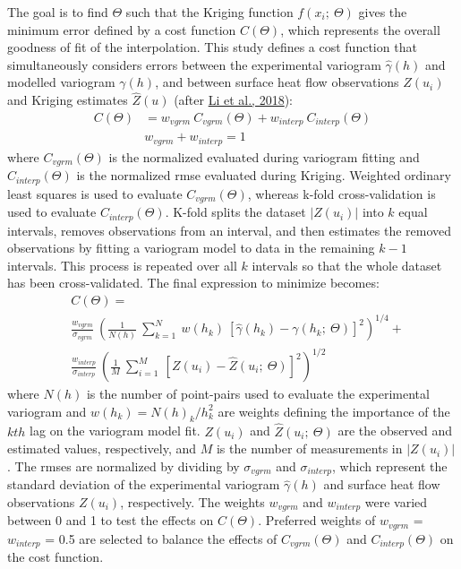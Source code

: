 The goal is to find \(\Theta\) such that the Kriging function \(f(x_i;\ \Theta)\) gives the minimum error defined by a cost function \(C(\Theta)\), which represents the overall goodness of fit of the interpolation. This study defines a cost function that simultaneously considers errors between the experimental variogram \(\hat{\gamma}(h)\) and modelled variogram \(\gamma(h)\), and between surface heat flow observations \(Z(u_i)\) and Kriging estimates \(\hat{Z}(u)\) (after \protect\hyperlink{ref-li2018}{Li et al., 2018}):
\begin{equation}
  \begin{aligned}
    C(\Theta) &= w_{vgrm}\ C_{vgrm}(\Theta) + w_{interp}\ C_{interp}(\Theta) \\
    &w_{vgrm} + w_{interp} = 1
  \end{aligned}
  \label{eq:cost}
\end{equation}
where \(C_{vgrm}(\Theta)\) is the normalized  evaluated during variogram fitting and \(C_{interp}(\Theta)\) is the normalized \gls{rmse} evaluated during Kriging. Weighted ordinary least squares is used to evaluate \(C_{vgrm}(\Theta)\), whereas k-fold cross-validation is used to evaluate \(C_{interp}(\Theta)\). K-fold splits the dataset \(|Z(u_i)|\) into \(k\) equal intervals, removes observations from an interval, and then estimates the removed observations by fitting a variogram model to data in the remaining \(k-1\) intervals. This process is repeated over all \(k\) intervals so that the whole dataset has been cross-validated. The final expression to minimize becomes:
\begin{equation}
  \begin{aligned}
    &C(\Theta) = \\
    &\frac{w_{vgrm}}{\sigma_{vgrm}}\ \left(\frac{1}{N(h)}\ \sum_{k=1}^{N}\ w(h_k)\ [\hat{\gamma}(h_k)-\gamma(h_k;\ \Theta)]^2\right)^{1/4} + \\
    &\frac{w_{interp}}{\sigma_{interp}}\ \left(\frac{1}{M}\ \sum_{i=1}^{M}\ [Z(u_i)-\hat{Z}(u_i;\ \Theta)]^2\right)^{1/2}
  \end{aligned}
  \label{eq:costExp}
\end{equation}
where \(N(h)\) is the number of point-pairs used to evaluate the experimental variogram and \(w(h_k) = N(h)_k/h_k^2\) are weights defining the importance of the \(kth\) lag on the variogram model fit. \(Z(u_i)\) and \(\hat{Z}(u_i;\ \Theta)\) are the observed and estimated values, respectively, and \(M\) is the number of measurements in \(|Z(u_i)|\). The \glspl{rmse} are normalized by dividing by \(\sigma_{vgrm}\) and \(\sigma_{interp}\), which represent the standard deviation of the experimental variogram \(\hat{\gamma}(h)\) and surface heat flow observations \(Z(u_i)\), respectively. The weights \(w_{vgrm}\) and \(w_{interp}\) were varied between 0 and 1 to test the effects on \(C(\Theta)\). Preferred weights of \(w_{vgrm}\) = \(w_{interp}\) = 0.5 are selected to balance the effects of \(C_{vgrm}(\Theta)\) and \(C_{interp}(\Theta)\) on the cost function.



